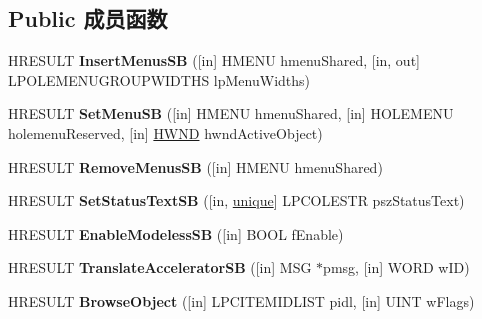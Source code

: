 \subsection*{Public 成员函数}
\begin{DoxyCompactItemize}
\item 
\mbox{\label{interface_i_shell_browser_af66b03bdfc9a071ac1228ddec5c7fda1}} 
H\+R\+E\+S\+U\+LT {\bfseries Insert\+Menus\+SB} (\mbox{[}in\mbox{]} H\+M\+E\+NU hmenu\+Shared, \mbox{[}in, out\mbox{]} L\+P\+O\+L\+E\+M\+E\+N\+U\+G\+R\+O\+U\+P\+W\+I\+D\+T\+HS lp\+Menu\+Widths)
\item 
\mbox{\label{interface_i_shell_browser_ad9c5f577537379ce54088ae93a567800}} 
H\+R\+E\+S\+U\+LT {\bfseries Set\+Menu\+SB} (\mbox{[}in\mbox{]} H\+M\+E\+NU hmenu\+Shared, \mbox{[}in\mbox{]} H\+O\+L\+E\+M\+E\+NU holemenu\+Reserved, \mbox{[}in\mbox{]} \hyperlink{interfacevoid}{H\+W\+ND} hwnd\+Active\+Object)
\item 
\mbox{\label{interface_i_shell_browser_a7cc4735b7fe9a877a05b3dfb3bc1c34a}} 
H\+R\+E\+S\+U\+LT {\bfseries Remove\+Menus\+SB} (\mbox{[}in\mbox{]} H\+M\+E\+NU hmenu\+Shared)
\item 
\mbox{\label{interface_i_shell_browser_ad8f75d92d160829f7948d5ffa0fd17bb}} 
H\+R\+E\+S\+U\+LT {\bfseries Set\+Status\+Text\+SB} (\mbox{[}in, \hyperlink{interfaceunique}{unique}\mbox{]} L\+P\+C\+O\+L\+E\+S\+TR psz\+Status\+Text)
\item 
\mbox{\label{interface_i_shell_browser_aa367aeeb1125afed38f5891c5bc5a261}} 
H\+R\+E\+S\+U\+LT {\bfseries Enable\+Modeless\+SB} (\mbox{[}in\mbox{]} B\+O\+OL f\+Enable)
\item 
\mbox{\label{interface_i_shell_browser_aee6b35b6408ecbc43ee16ff17177487b}} 
H\+R\+E\+S\+U\+LT {\bfseries Translate\+Accelerator\+SB} (\mbox{[}in\mbox{]} M\+SG $\ast$pmsg, \mbox{[}in\mbox{]} W\+O\+RD w\+ID)
\item 
\mbox{\label{interface_i_shell_browser_a5558deec711914e77e30cdfdb82826a2}} 
H\+R\+E\+S\+U\+LT {\bfseries Browse\+Object} (\mbox{[}in\mbox{]} L\+P\+C\+I\+T\+E\+M\+I\+D\+L\+I\+ST pidl, \mbox{[}in\mbox{]} U\+I\+NT w\+Flags)

\end{DoxyCompactItemize}
